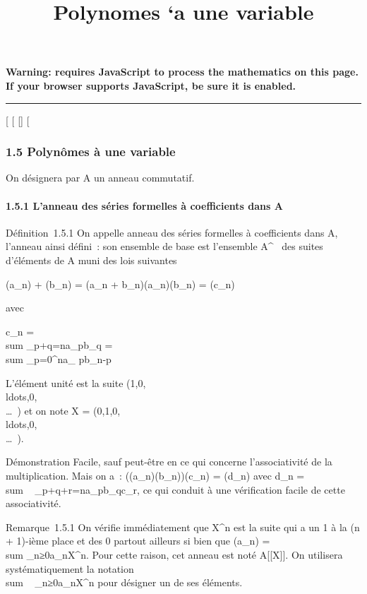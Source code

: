 \documentclass[]{article}
\title{Polynomes `a une variable}
\author{}
\date{}
\begin{document}
\maketitle

\textbf{Warning: 
requires JavaScript to process the mathematics on this page.\\ If your
browser supports JavaScript, be sure it is enabled.}

\begin{center}\rule{3in}{0.4pt}\end{center}

{[}
{[}
{[}{]}
{[}

\subsubsection{1.5 Polynômes à une variable}

On désignera par A un anneau commutatif.

\paragraph{1.5.1 L'anneau des séries formelles à coefficients dans A}

Définition~1.5.1 On appelle anneau des séries formelles à coefficients
dans A, l'anneau ainsi défini~: son ensemble de base est l'ensemble
A^~ des suites d'éléments de A muni des lois suivantes

(a_n) + (b_n) = (a_n +
b_n)\quad (a_n)(b_n) =
(c_n)

avec

c_n = \\sum
_p+q=na_pb_q = \\sum
_p=0^na_ pb_n-p

L'élément unité est la suite
(1,0,\\ldots,0,\\\ldots~)
et on note X =
(0,1,0,\\ldots,0,\\\ldots~).

Démonstration Facile, sauf peut-être en ce qui concerne l'associativité
de la multiplication. Mais on a~:
((a_n)(b_n))(c_n) = (d_n) avec
d_n = \\sum ~
_p+q+r=na_pb_qc_r, ce qui conduit à
une vérification facile de cette associativité.

Remarque~1.5.1 On vérifie immédiatement que X^n est la suite
qui a un 1 à la (n + 1)-ième place et des 0 partout ailleurs si bien que
(a_n) =\ \\sum
 _n≥0a_nX^n. Pour cette raison, cet
anneau est noté A{[}{[}X{]}{]}. On utilisera systématiquement la
notation \\sum ~
_n≥0a_nX^n pour désigner un de ses éléments.
\end{document}
